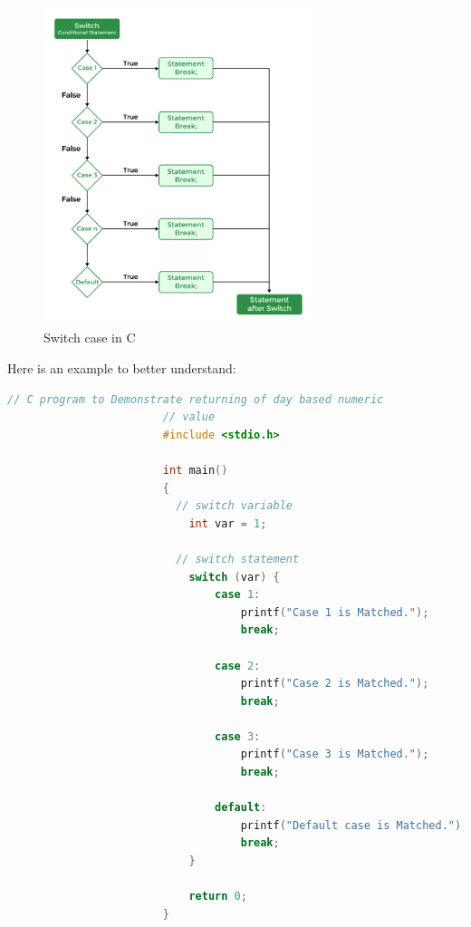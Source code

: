             \begin{figure}[!ht]
                        \centering
                        \captionsetup{justification=centering,margin=0.05cm}
                        \includegraphics[width=0.7\textwidth]{figures/switch-case-in-c.png}
                        \caption{\label{fig:switch-case-in-c}Switch case in C}
                    \end{figure} 
        
            Here is an example to better understand:
            
            \begin{lstlisting}[style=mystyle_c, language=c, breaklines]
                        // C program to Demonstrate returning of day based numeric
                        // value
                        #include <stdio.h>
                         
                        int main()
                        {
                          // switch variable
                            int var = 1;
                         
                          // switch statement
                            switch (var) {
                                case 1:
                                    printf("Case 1 is Matched.");
                                    break;
                         
                                case 2:
                                    printf("Case 2 is Matched.");
                                    break;
                         
                                case 3:
                                    printf("Case 3 is Matched.");
                                    break;
                         
                                default:
                                    printf("Default case is Matched.");
                                    break;
                            }
                         
                            return 0;
                        }
                        \end{lstlisting}
        
